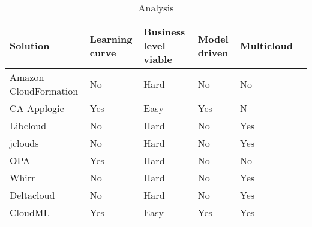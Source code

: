 \begin{table}
    \begin{tabular}{ | p{2cm} | p{2cm} | p{2.5cm} | p{2cm} | p{2cm} | p{2cm} |}
      \hline
      \textbf{Solution} & \textbf{Learning curve} & \textbf{Business level viable} & \textbf{Model driven} & \textbf{Multicloud} \\
      \hline
     Amazon CloudFormation & No & Hard & No & No \\ \hline
     CA Applogic & Yes & Easy & Yes & N  \\ \hline
     Libcloud & No & Hard & No & Yes \\ \hline
     jclouds & No & Hard & No & Yes \\ \hline
     OPA & Yes & Hard & No & No \\ \hline
     Whirr & No & Hard & No & Yes \\ \hline
     Deltacloud & No & Hard & No & Yes \\ \hline
     CloudML & Yes & Easy & Yes & Yes \\ \hline
  \end{tabular}
  \caption{Analysis}
  \label{table:analysis}
\end{table}

